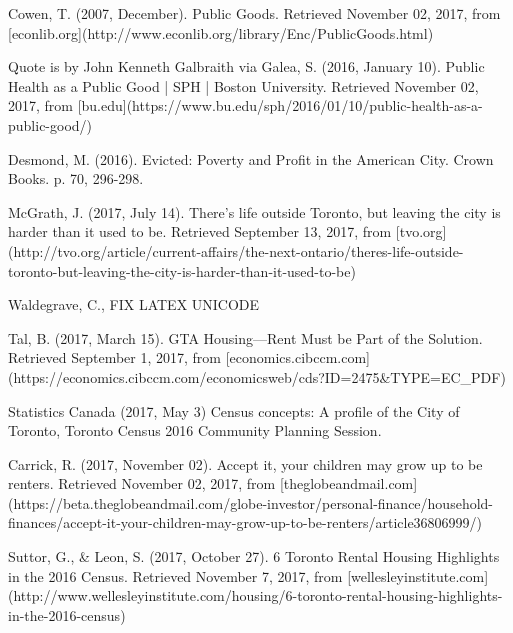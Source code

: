 \begin{thebibliography}{9}
  Cowen, T. (2007, December). Public Goods. Retrieved November 02, 2017, from [econlib.org](http://www.econlib.org/library/Enc/PublicGoods.html)

  Quote is by John Kenneth Galbraith via Galea, S. (2016, January 10). Public Health as a Public Good | SPH | Boston University. Retrieved November 02, 2017, from [bu.edu](https://www.bu.edu/sph/2016/01/10/public-health-as-a-public-good/)

   Desmond, M. (2016). Evicted: Poverty and Profit in the American City. Crown Books. p. 70, 296-298.

  McGrath, J. (2017, July 14). There's life outside Toronto, but leaving the city is harder than it used to be. Retrieved September 13, 2017, from [tvo.org](http://tvo.org/article/current-affairs/the-next-ontario/theres-life-outside-toronto-but-leaving-the-city-is-harder-than-it-used-to-be)

   Waldegrave, C., FIX LATEX UNICODE %

  Tal, B. (2017, March 15). GTA Housing—Rent Must be Part of the Solution. Retrieved September 1, 2017, from [economics.cibccm.com](https://economics.cibccm.com/economicsweb/cds?ID=2475\&TYPE=EC\_PDF)

  Statistics Canada (2017, May 3) Census concepts: A profile of the City of Toronto, Toronto Census 2016 Community Planning Session.

  Carrick, R. (2017, November 02). Accept it, your children may grow up to be renters. Retrieved November 02, 2017, from [theglobeandmail.com](https://beta.theglobeandmail.com/globe-investor/personal-finance/household-finances/accept-it-your-children-may-grow-up-to-be-renters/article36806999/)

  Suttor, G., \& Leon, S. (2017, October 27). 6 Toronto Rental Housing Highlights in the 2016 Census. Retrieved November 7, 2017, from [wellesleyinstitute.com](http://www.wellesleyinstitute.com/housing/6-toronto-rental-housing-highlights-in-the-2016-census)


\end{thebibliography}

